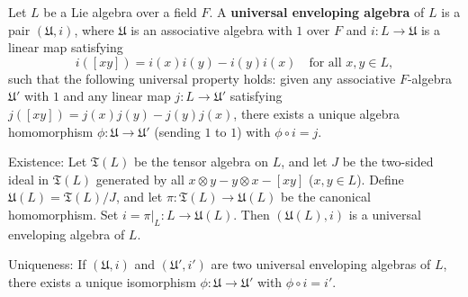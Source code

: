 Let $L$ be a Lie algebra over a field $F$. A \textbf{universal enveloping algebra} of $L$ is a pair $(\mathfrak{U}, i)$, where $\mathfrak{U}$ is an associative algebra with $1$ over $F$ and $i: L \to \mathfrak{U}$ is a linear map satisfying
$$i([xy]) = i(x)i(y) - i(y)i(x) \quad \text{for all } x, y \in L,$$
such that the following universal property holds: given any associative $F$-algebra $\mathfrak{U}'$ with $1$ and any linear map $j: L \to \mathfrak{U}'$ satisfying $j([xy]) = j(x)j(y) - j(y)j(x)$, there exists a unique algebra homomorphism $\phi: \mathfrak{U} \to \mathfrak{U}'$ (sending $1$ to $1$) with $\phi \circ i = j$.

Existence: Let $\mathfrak{T}(L)$ be the tensor algebra on $L$, and let $J$ be the two-sided ideal in $\mathfrak{T}(L)$ generated by all $x \otimes y - y \otimes x - [xy]$ ($x, y \in L$). Define $\mathfrak{U}(L) = \mathfrak{T}(L) / J$, and let $\pi: \mathfrak{T}(L) \to \mathfrak{U}(L)$ be the canonical homomorphism. Set $i = \pi|_L : L \to \mathfrak{U}(L)$. Then $(\mathfrak{U}(L), i)$ is a universal enveloping algebra of $L$.

Uniqueness: If $(\mathfrak{U}, i)$ and $(\mathfrak{U}', i')$ are two universal enveloping algebras of $L$, there exists a unique isomorphism $\phi: \mathfrak{U} \to \mathfrak{U}'$ with $\phi \circ i = i'$.
